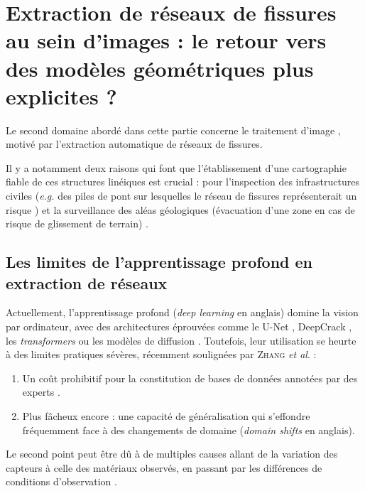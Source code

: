 \section{Extraction de réseaux de fissures au sein d'images : le retour vers des modèles géométriques plus explicites ?}

Le second domaine abordé dans cette partie concerne le traitement d'image \cite{jain1989fundamentals, Zerubia1995, Gonzalez2018ImageProcessing}, motivé par l'extraction automatique de réseaux de fissures. 

Il y a notamment deux raisons qui font que l'établissement d'une cartographie fiable de ces structures linéiques est crucial : pour l'inspection des infrastructures civiles (\emph{e.g.} des piles de pont sur lesquelles le réseau de fissures représenterait un risque \cite{cerema_iqoa_ponts_dalles}) et la surveillance des aléas géologiques (évacuation d'une zone en cas de risque de glissement de terrain) \cite{bird2016coastal, fauchard2023diachronic}. 

\subsection{Les limites de l'apprentissage profond en extraction de réseaux}

Actuellement, l'apprentissage profond (\emph{deep learning} en anglais) domine la vision par ordinateur, avec des architectures éprouvées comme le U-Net \cite{Unet2015}, DeepCrack \cite{DeepCrack2019}, les \emph{transformers} \cite{CrackFormer2021} ou les modèles de diffusion \cite{CrackSegDiff2024}. 
Toutefois, leur utilisation se heurte à des limites pratiques sévères, récemment soulignées par \textsc{Zhang} \emph{et al}. \cite{Zhang2025Review} : 
\begin{enumerate}
    \item Un coût prohibitif pour la constitution de bases de données annotées par des experts \cite{JosianeGANCrack2020}. 
    \item Plus fâcheux encore : une capacité de généralisation qui s'effondre fréquemment face à des changements de domaine \cite{Zhang2025Review} (\emph{domain shifts} en anglais).
\end{enumerate}

Le second point peut être dû à de multiples causes allant de la variation des capteurs à celle des matériaux observés, en passant par les différences de conditions d'observation \cite{Zhang2025Review}.

